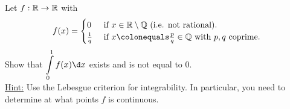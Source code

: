 \begin{problem}
  Let $f : \mathbb{R} \to \mathbb{R}$ with
    \[
      f(x) = \begin{cases}
        0 & \text{ if } x \in \R \setminus \Q \text{ (i.e. not rational).}\\
        \frac{1}{q} & \text{ if } x \colonequals \frac{p}{q} \in \Q \text{ with $p, q$ coprime}.
      \end{cases}
    \]
  Show that $\displaystyle \int\limits_0^1 f(x) \d x$ exists and is not equal to $0$.\\
  \underline{Hint:} Use the Lebesgue criterion for integrability.
    In particular, you need to determine at what points $f$ is continuous.
\end{problem}

\begin{answer}

\end{answer}
